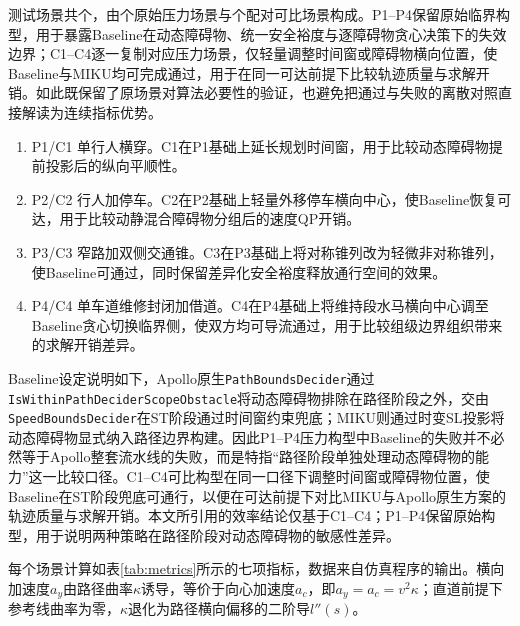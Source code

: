 测试场景共\MScenarioTotal{}个，由\MPressureScenarioTotal{}个原始压力场景与\MComparableScenarioTotal{}个配对可比场景构成。P1--P4保留原始临界构型，用于暴露Baseline在动态障碍物、统一安全裕度与逐障碍物贪心决策下的失效边界；C1--C4逐一复制对应压力场景，仅轻量调整时间窗或障碍物横向位置，使Baseline与MIKU均可完成通过，用于在同一可达前提下比较轨迹质量与求解开销。如此既保留了原场景对算法必要性的验证，也避免把通过与失败的离散对照直接解读为连续指标优势。

\begin{enumerate}
\item P1/C1 单行人横穿。C1在P1基础上延长规划时间窗，用于比较动态障碍物提前投影后的纵向平顺性。
\item P2/C2 行人加停车。C2在P2基础上轻量外移停车横向中心，使Baseline恢复可达，用于比较动静混合障碍物分组后的速度QP开销。
\item P3/C3 窄路加双侧交通锥。C3在P3基础上将对称锥列改为轻微非对称锥列，使Baseline可通过，同时保留差异化安全裕度释放通行空间的效果。
\item P4/C4 单车道维修封闭加借道。C4在P4基础上将维持段水马横向中心调至Baseline贪心切换临界侧，使双方均可导流通过，用于比较组级边界组织带来的求解开销差异。
\end{enumerate}

Baseline设定说明如下，Apollo原生\texttt{PathBoundsDecider}通过\texttt{IsWithinPathDeciderScopeObstacle}将动态障碍物排除在路径阶段之外，交由\texttt{SpeedBoundsDecider}在ST阶段通过时间窗约束兜底；MIKU则通过时变SL投影将动态障碍物显式纳入路径边界构建。因此P1--P4压力构型中Baseline的失败并不必然等于Apollo整套流水线的失败，而是特指“路径阶段单独处理动态障碍物的能力”这一比较口径。C1--C4可比构型在同一口径下调整时间窗或障碍物位置，使Baseline在ST阶段兜底可通行，以便在可达前提下对比MIKU与Apollo原生方案的轨迹质量与求解开销。本文所引用的效率结论仅基于C1--C4；P1--P4保留原始构型，用于说明两种策略在路径阶段对动态障碍物的敏感性差异。

每个场景计算如表\ref{tab:metrics}所示的七项指标，数据来自仿真程序的输出。横向加速度$a_y$由路径曲率$\kappa$诱导，等价于向心加速度$a_c$，即$a_y = a_c = v^2 \kappa$；直道前提下参考线曲率为零，$\kappa$退化为路径横向偏移的二阶导$l''(s)$。

